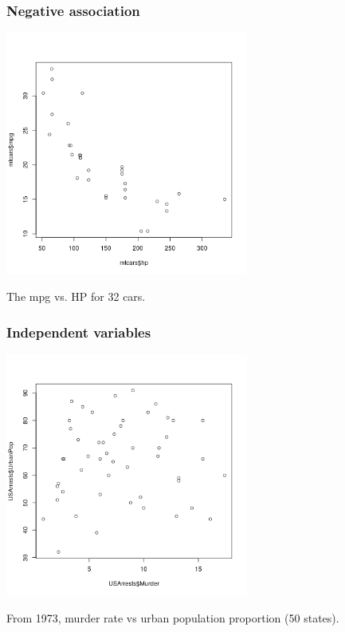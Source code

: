 \begin{frame}
\frametitle{Negative association}

\begin{center}
\includegraphics[width=0.6\textwidth]{1-2_data_basics/figures/cars/cars}
\end{center}

\small
The mpg vs. HP for 32 cars.

\end{frame}


\begin{frame}
\frametitle{Independent variables}

\begin{center}
\includegraphics[width=0.6\textwidth]{1-2_data_basics/figures/urbmur/urbmur}
\end{center}

\small
From 1973, murder rate vs urban population proportion (50 states).

\end{frame}



